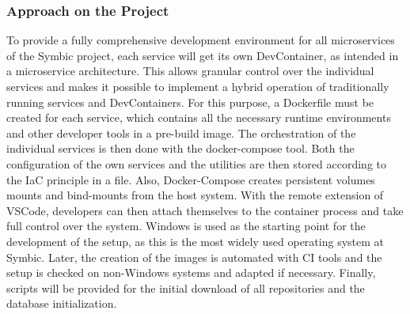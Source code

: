 \documentclass[12pt, a4paper]{article}
\begin{document}
        \subsubsection{Approach on the Project}\label{ssec::imp_approach}
        To provide a fully comprehensive development environment for all microservices of the Symbic project, each service will get its own DevContainer, as intended in a microservice architecture. This allows granular control over the individual services and makes it possible to implement a hybrid operation of traditionally running services and DevContainers. For this purpose, a Dockerfile must be created for each service, which contains all the necessary runtime environments and other developer tools in a pre-build image. The orchestration of the individual services is then done with the docker-compose tool. Both the configuration of the own services and the utilities are then stored according to the \ac{IaC} principle in a  file. Also, Docker-Compose creates persistent volumes mounts and bind-mounts from the host system. With the remote extension of \ac{VSCode}, developers can then attach themselves to the container process and take full control over the system.\newline
        Windows is used as the starting point for the development of the setup, as this is the most widely used operating system at Symbic. Later, the creation of the images is automated with CI tools and the setup is checked on non-Windows systems and adapted if necessary. Finally, scripts will be provided for the initial download of all repositories and the database initialization.
\end{document}
